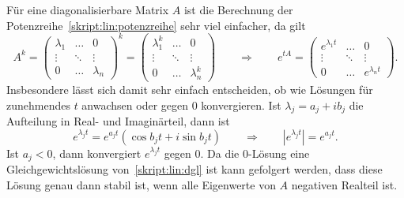 Für eine diagonalisierbare Matrix $A$ ist die Berechnung der
Potenzreihe~\eqref{skript:lin:potenzreihe} sehr viel einfacher, da
gilt
\begin{equation}
A^k
=
\begin{pmatrix}
\lambda_1&\dots &0        \\
\vdots   &\ddots&\vdots   \\
0        &\dots &\lambda_n
\end{pmatrix}^k
=
\begin{pmatrix}
\lambda_1^k&\dots &0        \\
\vdots     &\ddots&\vdots   \\
0          &\dots &\lambda_n^k
\end{pmatrix}
\qquad\Rightarrow\qquad
e^{tA}
=
\begin{pmatrix}
e^{\lambda_1 t} & \dots  & 0             \\
\vdots          & \ddots &\vdots         \\
0               & \dots  &e^{\lambda_n t}
\end{pmatrix}.
\label{skript:lin:expreihe}
\end{equation}
Insbesondere lässt sich damit sehr einfach entscheiden, ob wie Lösungen
für zunehmendes $t$ anwachsen oder gegen $0$ konvergieren.
Ist $\lambda_j = a_j + ib_j$ die Aufteilung in Real- und Imaginärteil,
dann ist
\[
e^{\lambda_jt} = e^{a_jt}(\cos b_jt +i\sin b_jt)
\qquad\Rightarrow\qquad
|e^{\lambda_j t}| = e^{a_jt}.
\]
Ist $a_j < 0$, dann konvergiert $e^{\lambda_jt}$ gegen $0$.
Da die $0$-Lösung eine Gleichgewichtslösung von~\eqref{skript:lin:dgl}
ist kann gefolgert werden, dass diese Lösung genau dann stabil ist, 
wenn alle Eigenwerte von $A$ negativen Realteil ist.

